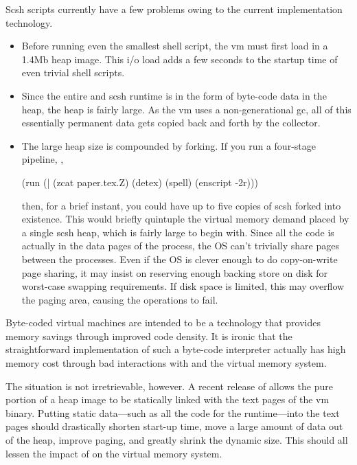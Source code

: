 Scsh scripts currently have a few problems owing to the current
{\scm} implementation technology. 
\begin{itemize}
\item Before running even the smallest shell script, the {\scm} vm must first 
  load in a 1.4Mb heap image.  This i/o load adds a few seconds to the startup
  time of even trivial shell scripts.

\item Since the entire {\scm} and scsh runtime is in the form of byte-code
  data in the {\Scheme} heap, the heap is fairly large. As the {\scm} vm
  uses a non-generational gc, all of this essentially permanent data
  gets copied back and forth by the collector.

\item The large heap size is compounded by {\Unix} forking. 
If you run a
four-stage pipeline, \eg,
\begin{code}
(run (| (zcat paper.tex.Z)
        (detex)
        (spell)
        (enscript -2r)))\end{code}
  then, for a brief instant, you could have up to five copies of scsh 
  forked into existence. This would briefly quintuple the virtual memory
  demand placed by a single scsh heap, which is fairly large to begin with. 
  Since all the code is actually in the data pages of the process, the OS
  can't trivially share pages between the processes. Even if the OS is clever
  enough to do copy-on-write page sharing, it may insist on reserving enough
  backing store on disk for worst-case swapping requirements. If disk space
  is limited, this may overflow the paging area, causing the 
  operations to fail.
\end{itemize}
%
Byte-coded virtual machines are intended to be a technology
that provides memory savings through improved code density.
It is ironic that the straightforward implementation of such a byte-code
interpreter actually has high memory cost through bad interactions with
{\Unix}  and the virtual memory system.

The situation is not irretrievable, however.  A recent release of {\scm}
allows the pure portion of a heap image to be statically linked with the
text pages of the vm binary. Putting static data---such as all the code for
the runtime---into the text pages should drastically shorten start-up time,
move a large amount of data out of the heap, improve paging, 
and greatly shrink the dynamic size.  This should all lessen
the impact of  on the virtual memory system.

